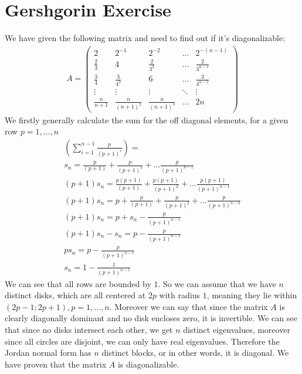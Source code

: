 \section{Gershgorin Exercise}
We have given the following matrix and need to find out if it's diagonalizable:
\begin{gather*}
A = \left( \begin{array}{ccccc}
2 & 2^{-1} & 2^{-2} & \ldots & 2^{-(n-1)}\\
\frac{2}{3} & 4 & \frac{2}{3^2}& \ldots & \frac{2}{3^{n-1}}\\
\frac{3}{4} & \frac{3}{4^2} & 6 & \ldots & \frac{3}{4^{n-1}}\\
\vdots & \vdots & \vdots & \ddots & \vdots \\
\frac{n}{n+1} & \frac{n}{(n+1)^2} & \frac{n}{(n+1)^3} & \ldots & 2n
\end{array}  \right)
\end{gather*}
We firstly generally calculate the sum for the off diagonal elements, for a given row $p = 1,\ldots,n$ 
\begin{gather*}
\left( \sum_{i=1}^{n-1} \frac{p}{(p+1)^i} \right) =\\
s_n = \frac{p}{(p+1)} + \frac{p}{(p+1)^2} + \ldots \frac{p}{(p+1)^{n-1}}\\
(p+1) s_n = \frac{p(p+1)}{(p+1) } + \frac{p(p+1)}{(p+1)^2} + \ldots \frac{p(p+1)}{(p+1)^{n-1}}\\
(p+1) s_n =  p + \frac{p}{(p+1)} + \frac{p}{(p+1)^2} + \ldots \frac{p}{(p+1)^{n-2}}\\
(p+1) s_n = p + s_n - \frac{p}{(p+1)^{n-1}}\\
(p+1) s_n - s_n = p - \frac{p}{(p+1)^{n-1}}\\
p s_n = p - \frac{p}{(p+1)^{n-1}}\\
s_n = 1 - \frac{1}{(p+1)^{n-1}}
\end{gather*}
We can see that all rows are bounded by $1$. So we can assume that we have $n$ distinct disks, which are all centered at $2p$ with radius $1$, meaning they lie within $(2p-1;2p+1), p = 1,\ldots,n$. Moreover we can say that since the matrix $A$ is clearly diagonally dominant and no disk encloses zero, it is invertible.
We can see that since no disks intersect each other, we get $n$ distinct eigenvalues, moreover since all circles are disjoint, we can only have real eigenvalues. Therefore the Jordan normal form has $n$ distinct blocks, or in other words, it is diagonal. 
We have proven that the matrix $A$ is diagonalizable.